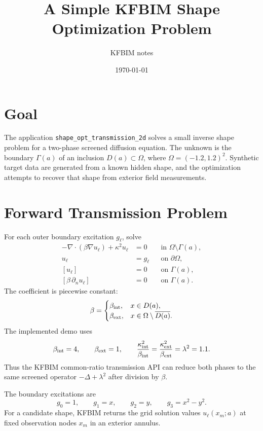 \documentclass[11pt]{article}
\title{A Simple KFBIM Shape Optimization Problem}
\author{KFBIM notes}
\date{\today}
\begin{document}
\maketitle

\section*{Goal}

The application \texttt{shape\_opt\_transmission\_2d} solves a small inverse
shape problem for a two-phase screened diffusion equation.  The unknown is the
boundary $\Gamma(a)$ of an inclusion $D(a)\subset \Omega$, where
$\Omega=(-1.2,1.2)^2$.  Synthetic target data are generated from a known hidden
shape, and the optimization attempts to recover that shape from exterior field
measurements.

\section*{Forward Transmission Problem}

For each outer boundary excitation $g_\ell$, solve
\begin{align}
    -\nabla\cdot(\beta \nabla u_\ell) + \kappa^2 u_\ell &= 0
        && \text{in } \Omega\setminus\Gamma(a), \\
    u_\ell &= g_\ell
        && \text{on } \partial\Omega, \\
    [u_\ell] &= 0
        && \text{on } \Gamma(a), \\
    [\beta\,\partial_n u_\ell] &= 0
        && \text{on } \Gamma(a).
\end{align}
The coefficient is piecewise constant:
\[
    \beta =
    \begin{cases}
    \beta_{\rm int}, & x\in D(a),\\
    \beta_{\rm ext}, & x\in \Omega\setminus\overline{D(a)}.
    \end{cases}
\]
The implemented demo uses
\[
    \beta_{\rm int}=4,\qquad
    \beta_{\rm ext}=1,\qquad
    \frac{\kappa_{\rm int}^2}{\beta_{\rm int}}
    =
    \frac{\kappa_{\rm ext}^2}{\beta_{\rm ext}}
    =
    \lambda^2=1.1.
\]
Thus the KFBIM common-ratio transmission API can reduce both phases to the
same screened operator $-\Delta+\lambda^2$ after division by $\beta$.

The boundary excitations are
\[
    g_0=1,\qquad
    g_1=x,\qquad
    g_2=y,\qquad
    g_3=x^2-y^2.
\]
For a candidate shape, KFBIM returns the grid solution values
$u_\ell(x_m;a)$ at fixed observation nodes $x_m$ in an exterior annulus.
\end{document}
